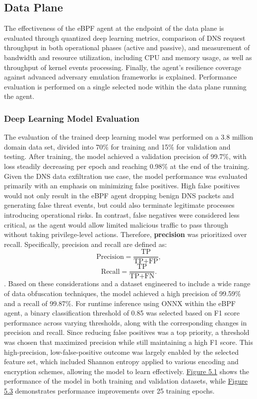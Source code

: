 \documentclass [11pt, proquest] {uwthesis}[2020/02/24]
\begin{document}
\subsection{Data Plane}
The effectiveness of the eBPF agent at the endpoint of the data plane is evaluated through quantized deep learning metrics, comparison of DNS request throughput in both operational phases (active and passive), and measurement of bandwidth and resource utilization, including CPU and memory usage, as well as throughput of kernel events processing. Finally, the agent’s resilience coverage against advanced adversary emulation frameworks is explained. Performance evaluation is performed on a single selected node within the data plane running the agent.

\subsubsection{Deep Learning Model Evaluation}
The evaluation of the trained deep learning model was performed on a 3.8 million domain data set, divided into 70\% for training and 15\% for validation and testing. After training, the model achieved a validation precision of 99.7\%, with loss steadily decreasing per epoch and reaching 0.98\% at the end of the training. Given the DNS data exfiltration use case, the model performance was evaluated primarily with an emphasis on minimizing false positives. High false positives would not only result in the eBPF agent dropping benign DNS packets and generating false threat events, but could also terminate legitimate processes introducing operational risks. In contrast, false negatives were considered less critical, as the agent would allow limited malicious traffic to pass through without taking privilege-level actions. Therefore, \textbf{precision} was prioritized over recall. Specifically, precision and recall are defined as:
\[
\text{Precision} = \frac{\text{TP}}{\text{TP} + \text{FP}},
\]
\[
\text{Recall} = \frac{\text{TP}}{\text{TP} + \text{FN}}.
\]
. Based on these considerations and a dataset engineered to include a wide range of data obfuscation techniques, the model achieved a high precision of 99.59\% and a recall of 99.87\%. For runtime inference using ONNX within the eBPF agent, a binary classification threshold of 0.85 was selected based on F1 score performance across varying thresholds, along with the corresponding changes in precision and recall. Since reducing false positives was a top priority, a threshold was chosen that maximized precision while still maintaining a high F1 score. This high-precision, low-false-positive outcome was largely enabled by the selected feature set, which included Shannon entropy applied to various encoding and encryption schemes, allowing the model to learn effectively. \hyperref[model-evaluation-metrics]{Figure 5.1} shows the performance of the model in both training and validation datasets, while \hyperref[fig:model_metrics_quadrant]{Figure 5.3} demonstrates performance improvements over 25 training epochs.
\end{document}
